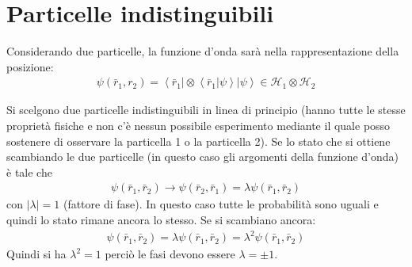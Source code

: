 %
%
%
%

\section{Particelle indistinguibili} %
Considerando due particelle, la funzione d'onda sarà nella rappresentazione della posizione:
\begin{equation}
\begin{split}
\psi \left(\bar r_1,r_2\right)=\left\langle \bar r_1\right |\otimes\left\langle \bar r_1|\psi  \right\rangle\left |\psi  \right\rangle\in \mathcal{H}_1\otimes\mathcal{H}_2
\end{split}
\end{equation}

Si scelgono due particelle indistinguibili in linea di principio (hanno tutte le stesse proprietà fisiche e non c'è nessun possibile esperimento mediante il quale posso sostenere di osservare la particella 1 o la particella 2). Se lo stato che si ottiene scambiando le due particelle (in questo caso gli argomenti della funzione d'onda) è tale che
\begin{equation}\begin{split}
\psi \left(\bar r_1,\bar r_2\right)\rightarrow \psi \left(\bar r_2,\bar r_1\right)=\lambda\psi \left(\bar r_1,\bar r_2\right)
\end{split}\end{equation}
con $|\lambda |=1$ (fattore di fase). In questo caso tutte le probabilità sono uguali e quindi lo stato rimane ancora lo stesso. Se si scambiano ancora:
\begin{equation}\begin{split}
\psi \left(\bar r_1,\bar r_2\right)= \lambda\psi \left(\bar r_1,\bar r_2\right)=\lambda^2 \psi \left(\bar r_1,\bar r_2\right) 
\end{split}\end{equation}
Quindi si ha $\lambda^2=1$ perciò le fasi devono essere $\lambda=\pm 1$.

